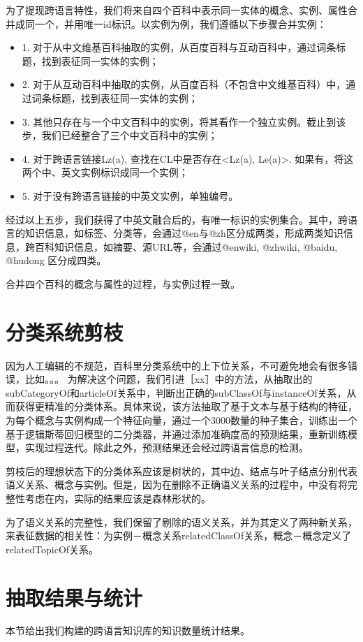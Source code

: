 为了提现跨语言特性，我们将来自四个百科中表示同一实体的概念、实例、属性合并成同一个，并用唯一id标识。以实例为例，我们遵循以下步骤合并实例：
\begin{itemize}
\item 1.  对于从中文维基百科抽取的实例，从百度百科与互动百科中，通过词条标题，找到表征同一实体的实例；
\item 2.  对于从互动百科中抽取的实例，从百度百科（不包含中文维基百科）中，通过词条标题，找到表征同一实体的实例；
\item 3.  其他只存在与一个中文百科中的实例，将其看作一个独立实例。截止到该步，我们已经整合了三个中文百科中的实例；
\item 4.  对于跨语言链接Lz(a), 查找在CL中是否存在<Lz(a), Le(a)>. 如果有，将这两个中、英文实例标识成同一个实例；
\item 5.  对于没有跨语言链接的中英文实例，单独编号。
\end{itemize}

经过以上五步，我们获得了中英文融合后的，有唯一标识的实例集合。其中，跨语言的知识信息，如标签、分类等，会通过@en与@zh区分成两类，形成两类知识信息，跨百科知识信息，如摘要、源URL等，会通过@enwiki, @zhwiki, @baidu, @hudong 区分成四类。

合并四个百科的概念与属性的过程，与实例过程一致。

\section{分类系统剪枝}

因为人工编辑的不规范，百科里分类系统中的上下位关系，不可避免地会有很多错误，比如。。。  为解决这个问题，我们引进［xx］中的方法，从抽取出的subCategoryOf和articleOf关系中，判断出正确的subClassOf与instanceOf关系，从而获得更精准的分类体系。具体来说，该方法抽取了基于文本与基于结构的特征，为每个概念与实例构成一个特征向量，通过一个3000数量的种子集合，训练出一个基于逻辑斯蒂回归模型的二分类器，并通过添加准确度高的预测结果，重新训练模型，实现过程迭代。除此之外，预测结果还会经过跨语言信息的检测。

剪枝后的理想状态下的分类体系应该是树状的，其中边、结点与叶子结点分别代表语义关系、概念与实例。但是，因为在删除不正确语义关系的过程中，中没有将完整性考虑在内，实际的结果应该是森林形状的。

为了语义关系的完整性，我们保留了剔除的语义关系，并为其定义了两种新关系，来表征数据的相关性：为实例－概念关系relatedClassOf关系，概念－概念定义了relatedTopicOf关系。

\section{抽取结果与统计}
本节给出我们构建的跨语言知识库的知识数量统计结果。


